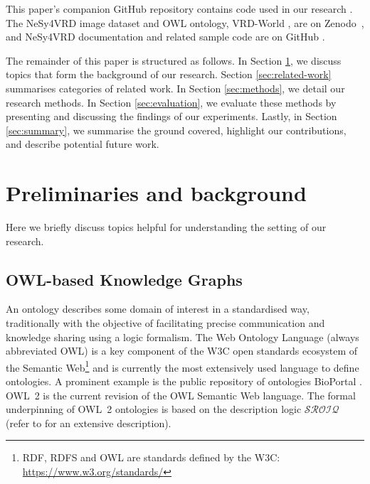 \documentclass[]{jair}
\begin{document}
This paper's companion GitHub repository contains code used in our research \cite{KGR4VRD_github}.
The NeSy4VRD image dataset and OWL ontology, VRD-World \cite{Herron/2023/nesy4vrd}, are on Zenodo~\cite{NeSy4VRD_v11}, and NeSy4VRD documentation and related sample code are on GitHub \cite{NeSy4VRD_github}.

The remainder of this paper is structured as follows.
In Section \ref{sec:preliminaries}, we discuss topics that form the background of our research.
Section \ref{sec:related-work} summarises categories of related work.
In Section \ref{sec:methods}, we detail our research methods.
In Section \ref{sec:evaluation}, we evaluate these methods by presenting and discussing the findings of our experiments.
Lastly, in Section \ref{sec:summary}, we summarise the ground covered, highlight our contributions, and describe potential future work.



\section{Preliminaries and background}
\label{sec:preliminaries}

Here we briefly discuss topics helpful for understanding the setting of our research.

\subsection{OWL-based Knowledge Graphs}
%
An ontology describes some domain of interest \cite{StaabAndStuder2009} in a standardised way, traditionally with the objective of facilitating precise communication and knowledge sharing using a logic formalism.
The Web Ontology Language (always abbreviated OWL) \cite{OWL2:Primer,Allemang2020,Uschold2018} is a key component of the W3C open standards ecosystem of the Semantic Web\footnote{RDF, RDFS and OWL are standards defined by the W3C: \url{https://www.w3.org/standards/}} \cite{SemanticWebBerners-Lee,Hitzler2010} and is currently the most extensively used language to define ontologies.
A prominent example is the public repository of ontologies BioPortal \cite{whetzel2011bioportal}.
OWL~2 is the current revision of the OWL Semantic Web language.
The formal underpinning of OWL~2 ontologies is based on the description logic $\mathcal{SROIQ}$ (refer to \citet{Baader2017,DBLP:conf/kr/HorrocksKS06} for an extensive description).
\end{document}
